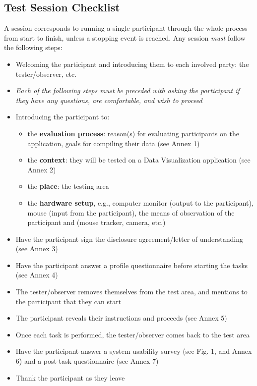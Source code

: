 \documentclass[twocolumn, letterpaper,13pt]{scrartcl}
\begin{document}
    \subsection{Test Session Checklist}
    A session corresponds to running a single participant through the whole process from start to finish, unless a stopping event is reached. Any session \textit{must} follow the following steps:
    \begin{itemize}
        \item Welcoming the participant and introducing them to each involved party: the tester/observer, etc.
        \item \textit{Each of the following steps must be preceded with asking the participant if they have any questions, are comfortable, and wish to proceed}
        \item Introducing the participant to:
        \begin{itemize}
            \item the \textbf{evaluation process}: reason(s) for evaluating participants on the application, goals for compiling their data (see Annex 1)
            \item the \textbf{context}: they will be tested on a Data Visualization application (see Annex 2)
            \item the \textbf{place}: the testing area
            \item the \textbf{hardware setup}, e.g., computer monitor (output to the participant), mouse (input from the participant), the means of observation of the participant and (mouse tracker, camera, etc.)
        \end{itemize}
        \item Have the participant sign the disclosure agreement/letter of understanding (see Annex 3)
        \item Have the participant answer a profile questionnaire before starting the tasks (see Annex 4)
        \item The tester/observer removes themselves from the test area, and mentions to the participant that they can start
        \item The participant reveals their instructions and proceeds (see Annex 5)
        \item Once each task is performed, the tester/observer comes back to the test area
        \item Have the participant answer a system usability survey (see Fig. 1, and Annex 6) and a post-task questionnaire (see Annex 7)
        \item Thank the participant as they leave
    \end{itemize}
    
\end{document}
